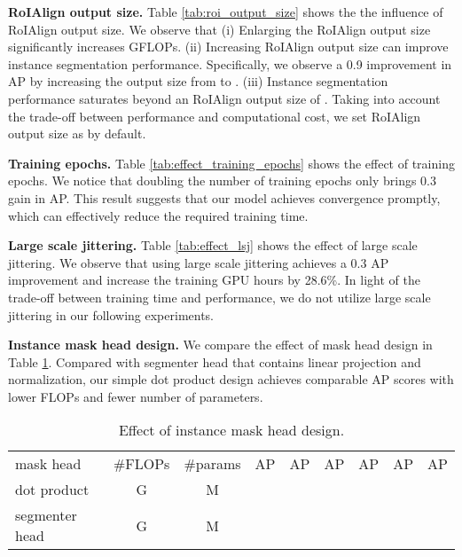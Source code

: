 \documentclass[10pt,twocolumn,letterpaper]{article}
\begin{document}
\vspace{1mm}
\noindent\textbf{RoIAlign output size.}
Table \ref{tab:roi_output_size} shows the the influence of RoIAlign output size. We observe that (i) Enlarging the RoIAlign output size significantly increases GFLOPs. (ii) Increasing RoIAlign output size can improve instance segmentation performance. Specifically, we observe a 0.9 improvement in AP by increasing the output size from  to . (iii) Instance segmentation performance saturates beyond an RoIAlign output size of . Taking into account the trade-off between performance and computational cost, we set RoIAlign output size as  by default.

\vspace{1mm}
\noindent\textbf{Training epochs.}
Table \ref{tab:effect_training_epochs} shows the effect of training epochs. We notice that doubling the number of training epochs only brings 0.3 gain in AP. This result suggests that our model achieves convergence promptly, which can effectively reduce the required training time.

\vspace{1mm}
\noindent\textbf{Large scale jittering.}
Table \ref{tab:effect_lsj} shows the effect of large scale jittering. We observe that using large scale jittering achieves a 0.3 AP improvement and increase the training GPU hours by 28.6\%. In light of the trade-off between training time and performance, we do not utilize large scale jittering in our following experiments.

\vspace{1mm}
\noindent\textbf{Instance mask head design.}
We compare the effect of mask head design in Table \ref{tab:effect_instance_mask_head}. Compared with segmenter head \cite{strudel2021segmenter} that contains linear projection and normalization, our simple dot product design achieves comparable AP scores with lower FLOPs and fewer number of parameters.


\begin{table}[t]
\begin{minipage}[t]{1\linewidth}
\vspace{2mm}
\centering
\setlength{\tabcolsep}{2pt}
\footnotesize
\renewcommand{\arraystretch}{1.3}
\resizebox{1.0\linewidth}{!}
{
\begin{tabular}{l|c|c|cccccc}
   mask head  & \#FLOPs & \#params & AP & AP & AP & AP & AP & AP  \\
    \shline
   \rowcolor{gray!10}dot product &  G &  M &  &  &  &  &  &  \\
   segmenter head  &  G &  M &  &  &  &  &  &  \\ 
\end{tabular}
}
\caption{\small{{
Effect of instance mask head design.}}
}
\label{tab:effect_instance_mask_head}
\end{minipage}
\end{table}
\end{document}
